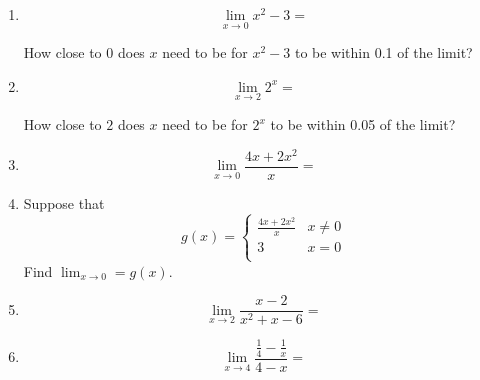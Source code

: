 \documentclass[11pt]{article}
\begin{document}
\begin{enumerate}
  \item{
\begin{displaymath}
  \lim_{x\to 0} x^2-3 = 
  \end{displaymath}

\vspace{.5in}
How close to $0$ does $x$ need to be for $x^2-3$ to be within 0.1 of the limit?

}
\vspace{1.5in}


\item{
\begin{displaymath}
  \lim_{x\to 2} 2^x = 
  \end{displaymath}

\vspace{.5in}
How close to $2$ does $x$ need to be for $2^x$ to be within 0.05 of the limit?

  }

  \pagebreak
  
  \item{
\begin{displaymath}
  \lim_{x\to 0} \frac{4x+2x^2}{x} = 
  \end{displaymath}

\vspace{1in}

  }


  \item{Suppose that
      \begin{displaymath}
g(x) =   \left\{ \begin{array}{ll}
 \frac{4x+2x^2}{x} & x \ne 0 \\
3 & x = 0\\
\end{array} \right.
  \end{displaymath}
Find $  \lim_{x\to 0} = g(x)$.

\vspace{1.3in}

  }


      \item{
\begin{displaymath}
  \lim_{x\to 2} \frac{x-2}{x^2+x-6} = 
  \end{displaymath}

\vspace{1.5in}

  }

              \item{
\begin{displaymath}
  \lim_{x\to 4} \frac{\frac14 - \frac{1}{x}}{4-x} = 
  \end{displaymath}

}
\end{enumerate}
\end{document}
